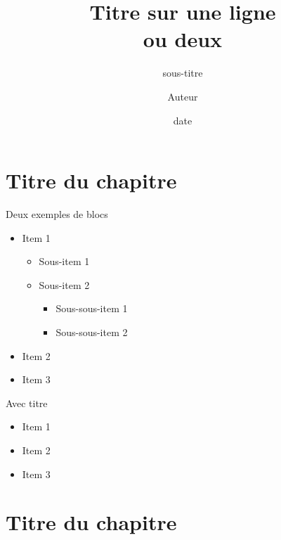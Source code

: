 \documentclass[slideopt,A4,showboxes,svgnames]{beamer}
\title[titrecourt]{Titre sur une ligne\\ ou deux}
\subtitle{sous-titre}
\date[date]{date}
\author[Auteur]{Auteur}
\begin{document}


\begin{frame}
    \titlepage
\end{frame}





 \frame{\tocpage}
 
 \section{Titre du chapitre}
 \frame{\sectionpage}
 
                  


\begin{frame}{Deux exemples de blocs}
    \begin{block}{}
 \begin{itemize}
    \item{Item 1 }
    \begin{itemize}
        \item {Sous-item 1}
 \item {Sous-item 2}
        \begin{itemize}
        \item {Sous-sous-item 1}
\item {Sous-sous-item 2}
    \end{itemize}
    \end{itemize}
    \item {Item 2}
    \item {Item 3}
    \end{itemize}
  \end{block}
      \begin{block}{Avec titre}
 \begin{itemize}
    \item{Item 1 }
    \item {Item 2}
    \item {Item 3}
    \end{itemize}
  \end{block}
\end{frame}




\section{Titre du chapitre}
 \frame{\sectionpage}
\end{document}
